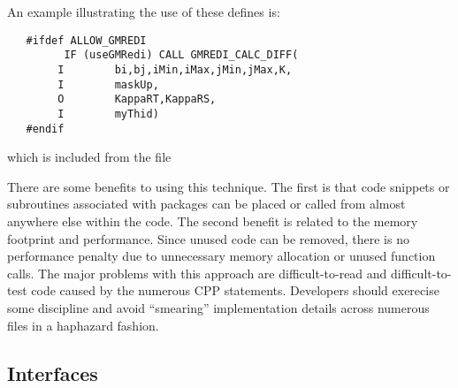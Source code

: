 An example illustrating the use of these defines is:
\begin{verbatim}
   #ifdef ALLOW_GMREDI
         IF (useGMRedi) CALL GMREDI_CALC_DIFF(
        I        bi,bj,iMin,iMax,jMin,jMax,K,
        I        maskUp,
        O        KappaRT,KappaRS,
        I        myThid)
   #endif
\end{verbatim}
which is included from the file

There are some benefits to using this technique.  The first is that
code snippets or subroutines associated with packages can be placed or
called from almost anywhere else within the code.  The second benefit
is related to the memory footprint and performance.  Since unused code
can be removed, there is no performance penalty due to unnecessary
memory allocation or unused function calls.  The major problems with
this approach are difficult-to-read and difficult-to-test code caused
by the numerous CPP statements.  Developers should exerecise some
discipline and avoid ``smearing'' implementation details across
numerous files in a haphazard fashion.



\subsection{Interfaces}


